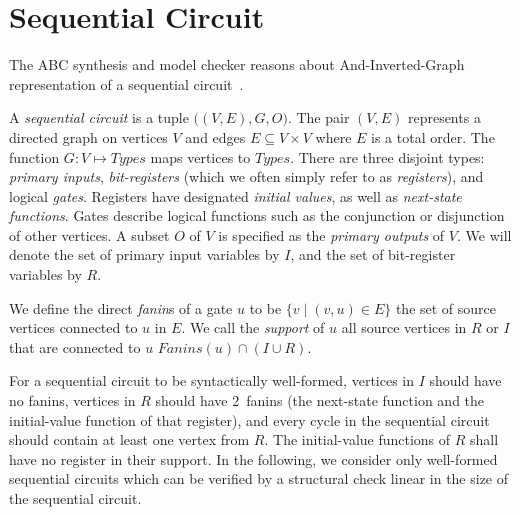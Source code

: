\section{Sequential Circuit}
\label{sec:sequential}

The ABC synthesis and model checker reasons about And-Inverted-Graph 
representation of a sequential circuit~\cite{brayton2010abc}. 

\begin{definition}
\rm A {\em sequential circuit} is a tuple $\big( (V, E),G,
O\big)$.  The pair $(V,E)$ represents a directed graph on
vertices $V$ and edges $E \subseteq V\times V$ where $E$
is a total order.  The function $G: V \mapsto
{\mathit Types}$ maps vertices to ${\mathit Types}$.
There are three disjoint types: {\em primary inputs}, {\em
bit-registers} (which we often simply refer to as {\em
registers}), and logical {\em gates}.  Registers have designated
{\em initial values}, as well as {\em next-state
functions}.  Gates describe logical functions such as
the conjunction or disjunction of other vertices. 
A subset $O$ of $V$ is specified as the {\em
primary outputs} of $V$.  
We will denote the set of primary input variables by $I$,
and the set of bit-register variables by $R$.  
\label{def:back:seq_circuit}
\end{definition}

\begin{definition}[Fanins]
\rm We define the direct {\em fanin}s of a gate $u$ to be
$\{v \mid (v,u)\in E\}$ the set of source vertices connected
to $u$ in $E$.  
We call the {\em support} of $u$ 
all source vertices in $R$ or $I$ that are connected to $u$
$\mathit{Fanins}(u) \cap (I \cup R)$.
\label{def:back:fanins} 
\end{definition}


For a sequential
circuit to be syntactically well-formed, vertices in $I$
should have no fanins, vertices in $R$ should have
2~fanins (the next-state function and the initial-value
function of that register), %
and every cycle in the sequential circuit should contain
at least one vertex from $R$.  The initial-value functions
of $R$ shall have no register in their support.  
In the following, 
we consider only well-formed sequential circuits which can be 
verified by a structural check linear in the size of the 
sequential circuit.

